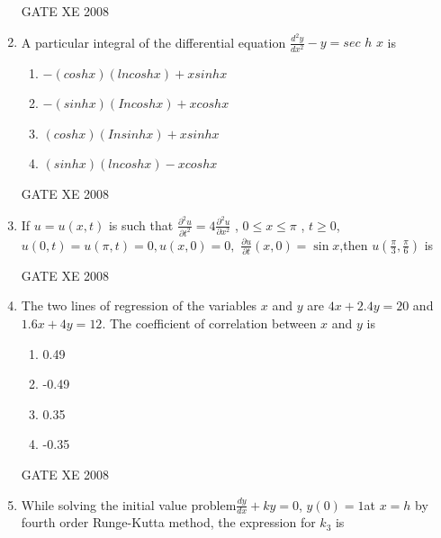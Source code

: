 \documentclass[12pt]{article}
\begin{document}
\begin{enumerate}
GATE XE 2008
\item  A particular integral of the differential equation {\large $\frac{d^2y}{dx^2} - y = sec$ $h$ $x$} is

\begin{enumerate}
\item $- (cosh x) (ln cosh x) + xsinhx$
\item $- (sinh x) (Incosh x) + xcosh x$
\item $(cosh x) (Insinh x) + xsinh x$
\item $(sinh x) (ln cosh x) - x cosh x$
\end{enumerate}

GATE XE 2008
\item If $u=u(x,t)$ is such that $\frac{\partial^2 u}{\partial t^2} = 4\frac{\partial^2 u}{\partial x^2}$ , $0\leq x \leq \pi$ , $t \geq 0$, \newline $u(0,t)=u(\pi , t)=0,$\newline $u(x,0)=0,$ \newline $\frac{\partial u}{\partial t}(x,0)=\sin{x}$,\newline then $u(\frac{\pi}{3}, \frac{\pi}{6})$ is

\begin{enumerate}
\end{enumerate}


GATE XE 2008
\item The two lines of regression of the variables $x$ and $y$ are
$4x+2.4y = 20$ and $1.6x +4y =12$.
The coefficient of correlation between $x$ and $y$ is

\begin{enumerate}
\item 0.49
\item -0.49
\item  0.35
\item -0.35
\end{enumerate}

GATE XE 2008
\item While solving the initial value problem\newline $\frac{dy}{dx}+ky=0$, $y(0)=1$\newline at $x = h$ by fourth order Runge-Kutta method, the expression for $k_3$ is


\end{enumerate}
\end{document}
